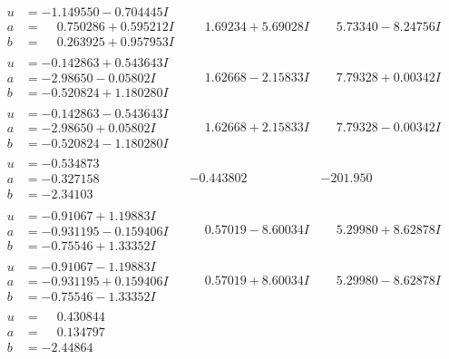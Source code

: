 \documentclass[1p]{elsarticle_modified}
\theoremstyle{definition}
\begin{document}
$$\begin{array}{c|c|c}
\begin{aligned}
u &= -1.149550 - 0.704445 I \\
a &= \phantom{-}0.750286 + 0.595212 I \\
b &= \phantom{-}0.263925 + 0.957953 I\end{aligned}
 & \phantom{-}1.69234 + 5.69028 I & \phantom{-}5.73340 - 8.24756 I \\ \hline\begin{aligned}
u &= -0.142863 + 0.543643 I \\
a &= -2.98650 - 0.05802 I \\
b &= -0.520824 + 1.180280 I\end{aligned}
 & \phantom{-}1.62668 - 2.15833 I & \phantom{-}7.79328 + 0.00342 I \\ \hline\begin{aligned}
u &= -0.142863 - 0.543643 I \\
a &= -2.98650 + 0.05802 I \\
b &= -0.520824 - 1.180280 I\end{aligned}
 & \phantom{-}1.62668 + 2.15833 I & \phantom{-}7.79328 - 0.00342 I \\ \hline\begin{aligned}
u &= -0.534873\phantom{ +0.000000I} \\
a &= -0.327158\phantom{ +0.000000I} \\
b &= -2.34103\phantom{ +0.000000I}\end{aligned}
 & -0.443802\phantom{ +0.000000I} & -201.950\phantom{ +0.000000I} \\ \hline\begin{aligned}
u &= -0.91067 + 1.19883 I \\
a &= -0.931195 - 0.159406 I \\
b &= -0.75546 + 1.33352 I\end{aligned}
 & \phantom{-}0.57019 - 8.60034 I & \phantom{-}5.29980 + 8.62878 I \\ \hline\begin{aligned}
u &= -0.91067 - 1.19883 I \\
a &= -0.931195 + 0.159406 I \\
b &= -0.75546 - 1.33352 I\end{aligned}
 & \phantom{-}0.57019 + 8.60034 I & \phantom{-}5.29980 - 8.62878 I \\ \hline\begin{aligned}
u &= \phantom{-}0.430844\phantom{ +0.000000I} \\
a &= \phantom{-}0.134797\phantom{ +0.000000I} \\
b &= -2.44864\phantom{ +0.000000I}\end{aligned}

\end{array}$$
\end{document}
